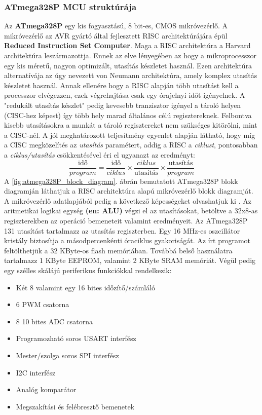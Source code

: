 \documentclass[a4paper,12pt]{article}
\begin{document}
\subsubsection{ATmega328P MCU struktúrája}

Az \textbf{ATmega328P} egy kis fogyasztású, 8 bit-es, CMOS mikróvezérlő. 
A mikróvezérlő az AVR gyártó által fejlesztett RISC architektúrájára  épül \textbf{Reduced Instruction Set Computer}. 
Maga a RISC architektúra a Harvard architektúra leszármazottja.
Ennek az elve lényegében az hogy a mikroprocesszor egy kis méretű, nagyon optimizált, utasítás készletet használ.
Ezen architektúra alternatívája az úgy nevezett von Neumann architektúra, amely komplex utasítás készletet használ.
Annak ellenére hogy a RISC alapján több utasítást kell a processzor elvégezzen, ezek végrehajtása csak egy órajelnyi időt igényelnek. 
A "redukált utasítás készlet" pedig kevesebb tranzisztor igényel a tároló helyen (CISC-hez képest) így több hely marad általános célú regisztereknek. \cite{er00}
Felbontva kisebb utasításokra a munkát a tároló regisztereket nem szükséges kitörölni, mint a CISC-nél.
A jól meghatározott teljesítmény egyenlet alapján látható, hogy míg a CISC megközelítés az \textit{utasítás} paramétert, addig a RISC a \textit{ciklust}, pontosabban a \textit{ciklus/utasítás} csökkentésével éri el ugyanazt az eredményt:
\begin{equation*}
\frac{\text{idő}}{program} = \frac{\text{idő}}{ciklus} \times \frac{ciklus}{\text{utasítás}} \times \frac{\text{utasítás}}{program}
\end{equation*}
A \ref{fig:atmega328P_block_diagram}. ábrán bemutatott ATmega328P blokk diagramján láthatjuk a RISC architektúra alapú mikróvezérlő blokk diagramját.
A mikróvezérlő adatlapjából pedig a következő képességeket olvashatjuk ki \cite{avratm15}.
Az aritmetikai logikai egység \textbf{(en: ALU) }végzi el az utasításokat, betöltve a 32x8-as regiszterekben az operáció bemeneteit valamint eredményeit.
Az ATmega328P 131 utasítást tartalmazz az utasítás regiszterben. Egy 16 MHz-es oszcillátor kristály biztosítja a másodpercenkénti óraciklus gyakoriságát.
Az írt programot feltölthetjük a 32 KByte-os flash memóriában. Továbbá belső használatra tartalmazz 1 KByte EEPROM, valamint 2 KByte SRAM memóriát.
Végül pedig egy szélles skálájú periferikus funkciókkal rendelkezik:

\begin{itemize}
	\item Két 8 valamint egy 16 bites időzítő/számláló
	\item 6 PWM csatorna
	\item 8 10 bites ADC csatorna
	\item Programozható soros USART interfész
	\item Mester/szolga soros SPI interfész
	\item I2C interfész
	\item Analóg komparátor
	\item Megszakítási és felébresztő bemenetek
\end{itemize}
\end{document}
